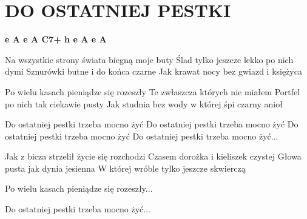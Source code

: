 \documentclass[../../../songbook.tex]{subfiles}
\begin{document}
\TabPositions{8cm} %
\section*{DO OSTATNIEJ PESTKI}
{}
\vspace{0.5cm}
{\color{red}\textbf{e A e A C7+ h e A e A} } \newline

Na wszystkie strony świata biegną moje buty 	 \newline
Ślad tylko jeszcze lekko po nich dymi 			 \newline
Sznurówki butne i do końca czarne 				 \newline
Jak krawat nocy bez gwiazd i księżyca 			 \newline

Po wielu kasach pieniądze się rozeszły  		 \newline
Te zwłaszcza których nie miałem 				 \newline
Portfel po nich tak ciekawie pusty  			 \newline
Jak studnia bez wody w której śpi czarny anioł 	 \newline

\-\hspace{1cm} Do ostatniej pestki trzeba mocno żyć  	  \newline
\-\hspace{1cm} Do ostatniej pestki trzeba mocno żyć  \newline
\-\hspace{1cm} Do ostatniej pestki trzeba mocno żyć  \newline
\-\hspace{1cm} Do ostatniej pestki trzeba mocno żyć...  \newline

Jak z bicza strzelił życie się rozchodzi  \newline
Czasem dorożka i kieliszek czystej  \newline
Głowa pusta jak dynia jesienna  \newline
W której wróble tylko jeszcze skwierczą  \newline

Po wielu kasach pieniądze się rozeszły...  \newline

\-\hspace{1cm} Do ostatniej pestki trzeba mocno żyć...
	
\end{document}
